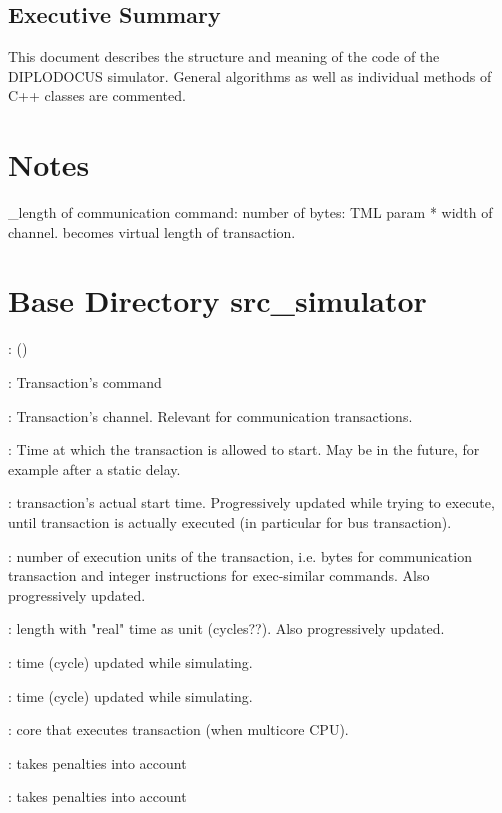 \documentclass[a4paper,11pt]{article}
\newcommand{\bfont}{\fontseries{b}\selectfont}
\newcommand{\cod}[1]{{\ttfamily #1}}
\newcommand{\class}[2]{\par\vspace{1mm}\hspace{-5mm}\large\colorbox{file}{\textbullet\bfont\cod{#1}:} (\cod{#2})\par}
\newcommand{\method}[1]{\par\vspace{1mm}\hspace{-2mm}\colorbox{method}{\textopenbullet\bfont\cod{#1}:}}
\newcommand{\variable}[1]{\par\vspace{1mm}\hspace{-2mm}\colorbox{variable}{\textopenbullet\bfont\cod{#1}:}}
\begin{document}
\subsection{Executive Summary}

This document describes the structure and meaning of the code of the DIPLODOCUS simulator. General algorithms as well as individual methods of C++ classes are commented.

\newpage 

\section*{Notes}
\cod{\_length} of communication command: number of bytes: TML param * width of channel. becomes virtual length of transaction.
\section*{Base Directory \cod{src\_simulator}}
\class{Transaction}{}
\variable{\_command} Transaction's command
\variable{\_channel} Transaction's channel. Relevant for communication transactions.
\variable{\_runnableTime} Time at which the transaction is allowed to start. May be in the future, for example after a static delay.
\variable{\_startTime} transaction's actual start time. Progressively updated while trying to execute, until transaction is actually executed (in particular for bus transaction).
\variable{\_virtualLength} number of execution units of the transaction, i.e. bytes for communication transaction and integer instructions for exec-similar commands. Also progressively updated.
\variable{\_length} length with "real" time as unit (cycles??). Also progressively updated.
\variable{\_idlePenalty} time (cycle) updated while simulating.
\variable{\_taskSwitchingPenalty} time (cycle) updated while simulating.
\variable{\_transactCoreNumber} core that executes transaction (when multicore CPU).
\method{getStartTimeOperation()} takes penalties into account
\method{getEndTime()} takes penalties into account
\end{document}
